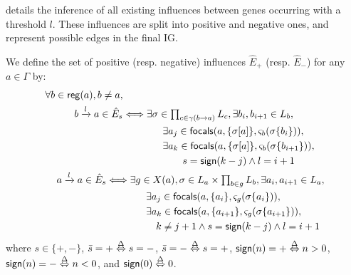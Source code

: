  details the inference of all existing influences between genes occurring
with a threshold $l$.
These influences are split into positive and negative ones, and represent possible edges in the final IG.
\begin{definition}\label{def:inference-edges}
We define the set of positive (resp. negative) influences $\hat{E}_+$ (resp. $\hat{E}_-$) for any
$a\in\Gamma$ by:
\begin{align}
\begin{split}
\forall b\in\mathsf{reg}({a}), b\neq a, \\
b\xrightarrow l a \in \hat{E}_s & \Longleftrightarrow
 \exists \sigma\in\textstyle\prod_{c\in\gamma(b\rightarrow a)} L_c, \exists b_i,b_{i+1}\in L_b,\\
& \qquad\qquad
        \exists a_{j}\in\mathsf{focals}(a, \{\sigma[a]\}, \varsigma_b(\sigma\{b_i\})), \\
& \qquad\qquad
        \exists a_{k}\in\mathsf{focals}(a, \{\sigma[a]\}, \varsigma_b(\sigma\{b_{i+1}\})), \\
& \qquad\qquad\qquad
                        s = \mathsf{sign}(k - j) \wedge l = i+1
\end{split}
\label{eq:edges-inference-b}
\\
\begin{split}
a \xrightarrow l a \in \hat{E}_s & \Longleftrightarrow
\exists g \in X(a), \sigma \in L_a\times \textstyle\prod_{b\in g} L_b,
			\exists a_i,a_{i+1}\in L_a, \\
& \qquad\qquad
        \exists a_{j}\in\mathsf{focals}(a, \{a_i\}, \varsigma_g(\sigma\{a_i\})), \\
& \qquad\qquad
        \exists a_{k}\in\mathsf{focals}(a, \{a_{i+1}\},  \varsigma_g(\sigma\{a_{i+1}\})), \\
& \qquad\qquad\quad
			k \neq j+1
				\wedge s = \mathsf{sign}(k - j) \wedge l = i+1
\end{split}
\label{eq:edges-inference-a}
\end{align}
where $s \in \{ +, - \}$, $\bar s = + \stackrel{\Delta}\Leftrightarrow s = -$, $\bar s = - \stackrel{\Delta}\Leftrightarrow s = +$,
$\mathsf{sign}(n) = + \stackrel{\Delta}\Leftrightarrow n > 0$,
$\mathsf{sign}(n) = - \stackrel{\Delta}\Leftrightarrow n < 0$,
and $\mathsf{sign}(0) \stackrel{\Delta}\Leftrightarrow 0$.
\end{definition}

